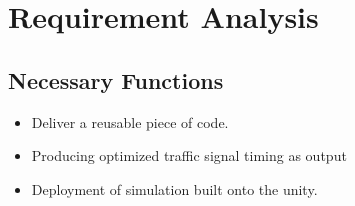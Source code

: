 \documentclass[openany,12pt]{report}
\begin{document}

	
	
	\section{Requirement Analysis}
	
	\subsection{Necessary Functions}
	\begin{itemize}
		\item{Deliver a reusable piece of code.}
		\item{Producing optimized traffic signal timing as output}
		\item{Deployment of simulation built onto the unity.}
	\end{itemize}
	
\end{document}
